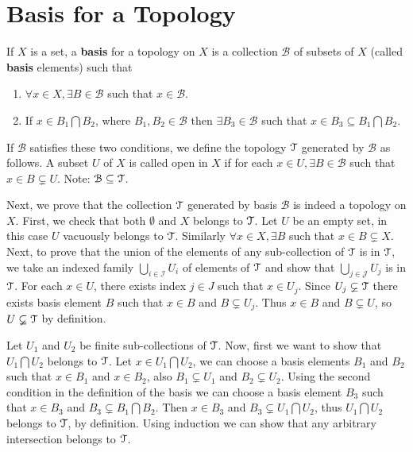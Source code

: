\documentclass[a4paper,english,12pt]{article}   	%
\begin{document}
\section{Basis for a Topology}
\begin{defn}
 If $X$ is a set, a \textbf{basis} for a topology on $X$ is a collection $\mathcal{B}$ of subsets of $X$ (called \textbf{basis} elements) such that 
 \begin{enumerate}
  \item $\forall x\in X, \exists B\in \mathcal{B}$ such that $x\in \mathcal{B}$.
  \item If $x\in B_1\bigcap B_2$, where $B_1, B_2 \in \mathcal{B}$ then $\exists B_3 \in \mathcal{B}$ such that $x\in B_3\subseteq B_1\bigcap B_2$.
 \end{enumerate}
\end{defn}
 If $\mathcal{B}$ satisfies these two conditions, we define the topology $\mathcal{T}$ generated by $\mathcal{B}$ as follows. A subset $U$ of $X$ is called open in $X$ if for each $x\in U, \exists B\in \mathcal{B}$ such that $x\in B\varsubsetneq U$. 
 Note: $\mathcal{B}\subseteq\mathcal{T}$.
 
 Next, we prove that the collection $\mathcal{T}$ generated by basis $\mathcal{B}$ is indeed a topology on $X$. First, we check that both $\emptyset$ and $X$ belongs to $\mathcal{T}$. Let $U$ be an empty set, in this case $U$ vacuously belongs to $\mathcal{T}$. Similarly $\forall x\in X, \exists B$ such that $x\in B\varsubsetneq X$. Next, to prove that the union of the elements of any sub-collection of $\mathcal{T}$ is in $\mathcal{T}$, we take an indexed family $\bigcup_{i\in \mathcal{I}}U_i$ of elements of $\mathcal{T}$  and show that $\bigcup_{j\in \mathcal{J}}U_j$ is in $\mathcal{T}$. For each $x\in U$, there exists index $j\in J$ such that $x\in U_j$. Since $U_j \varsubsetneq \mathcal{T}$ there exists basis element $B$ such that $x\in B$ and $B\varsubsetneq U_j$. Thus $x\in B$ and $B\varsubsetneq U$, so $U\varsubsetneq\mathcal{T}$ by definition. 
 
 Let $U_1$ and $U_2$  be finite sub-collections of $\mathcal{T}$. Now, first we want to show that $U_1\bigcap U_2 $ belongs to $\mathcal{T}$. Let $x\in U_1\bigcap U_2 $, we can choose a basis elements $B_1$ and $B_2$ such that $x\in B_1$ and $x\in B_2$, also $ B_1\varsubsetneq U_1$ and $B_2\varsubsetneq U_2$. Using the second condition in the definition of the basis we can choose a basis element $B_3$ such that $x\in B_3$ and $B_3\varsubsetneq B_1\bigcap B_2$. Then $x\in B_3$ and $B_3\varsubsetneq U_1\bigcap U_2$, thus $U_1\bigcap U_2$ belongs to $\mathcal{T}$, by definition. Using induction we can show that any arbitrary intersection belongs to $\mathcal{T}$.
\end{document}
